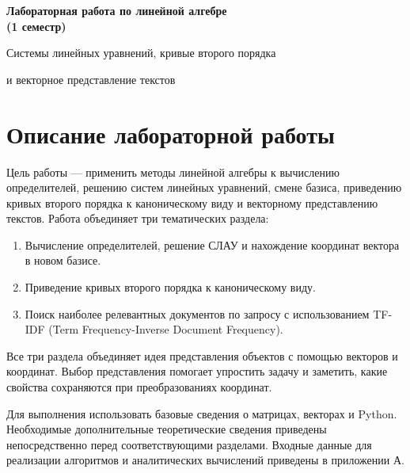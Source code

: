 \documentclass[12pt,a4paper]{article}
\begin{document}
\sloppy
\begin{center}
{\LARGE\bfseries Лабораторная работа по линейной алгебре \\ (1 семестр)\par}
\vspace{0.4em}
{\large Системы линейных уравнений, кривые второго порядка\par
и векторное представление текстов\par}
\end{center}

\section*{Описание лабораторной работы}
Цель работы --- применить методы линейной алгебры к вычислению определителей,
решению систем линейных уравнений, смене базиса, приведению кривых второго порядка
к каноническому виду и векторному представлению текстов. Работа объединяет три тематических раздела:
\begin{enumerate}
\item Вычисление определителей, решение СЛАУ и нахождение координат вектора в новом базисе.
\item Приведение кривых второго порядка к каноническому виду.
\item Поиск наиболее релевантных документов по запросу с использованием TF-IDF (Term Frequency-Inverse Document Frequency).
\end{enumerate}

{
Все три раздела объединяет идея представления объектов с помощью векторов и координат. 
Выбор представления помогает упростить задачу и заметить, какие свойства сохраняются при преобразованиях координат.
}

Для выполнения использовать базовые сведения о матрицах, векторах и Python.
Необходимые дополнительные теоретические сведения приведены непосредственно перед соответствующими разделами.
Входные данные для реализации алгоритмов и аналитических вычислений приведены в приложении А.
\end{document}
